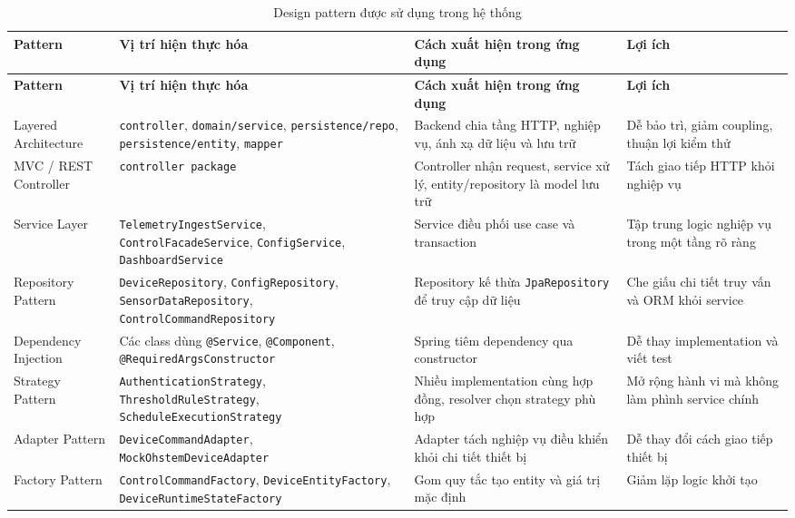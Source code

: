 {\scriptsize
\setlength{\tabcolsep}{3pt}
\renewcommand{\arraystretch}{1.12}
\begin{longtable}{|p{}|p{}|p{}|p{}|}
\caption{Design pattern được sử dụng trong hệ thống}\\
\hline
\textbf{Pattern} & \textbf{Vị trí hiện thực hóa} & \textbf{Cách xuất hiện trong ứng dụng} & \textbf{Lợi ích} \\
\hline
\endfirsthead
\hline
\textbf{Pattern} & \textbf{Vị trí hiện thực hóa} & \textbf{Cách xuất hiện trong ứng dụng} & \textbf{Lợi ích} \\
\hline
\endhead
Layered Architecture & \texttt{controller}, \texttt{domain/service}, \texttt{persistence/repo}, \texttt{persistence/entity}, \texttt{mapper} & Backend chia tầng HTTP, nghiệp vụ, ánh xạ dữ liệu và lưu trữ & Dễ bảo trì, giảm coupling, thuận lợi kiểm thử \\
\hline
MVC / REST Controller & \texttt{controller package} & Controller nhận request, service xử lý, entity/repository là model lưu trữ & Tách giao tiếp HTTP khỏi nghiệp vụ \\
\hline
Service Layer & \texttt{TelemetryIngestService}, \texttt{ControlFacadeService}, \texttt{ConfigService}, \texttt{DashboardService} & Service điều phối use case và transaction & Tập trung logic nghiệp vụ trong một tầng rõ ràng \\
\hline
Repository Pattern & \texttt{DeviceRepository}, \texttt{ConfigRepository}, \texttt{SensorDataRepository}, \texttt{ControlCommandRepository} & Repository kế thừa \texttt{JpaRepository} để truy cập dữ liệu & Che giấu chi tiết truy vấn và ORM khỏi service \\
\hline
Dependency Injection & Các class dùng \texttt{@Service}, \texttt{@Component}, \texttt{@RequiredArgsConstructor} & Spring tiêm dependency qua constructor & Dễ thay implementation và viết test \\
\hline
Strategy Pattern & \texttt{AuthenticationStrategy}, \texttt{ThresholdRuleStrategy}, \texttt{ScheduleExecutionStrategy} & Nhiều implementation cùng hợp đồng, resolver chọn strategy phù hợp & Mở rộng hành vi mà không làm phình service chính \\
\hline
Adapter Pattern & \texttt{DeviceCommandAdapter}, \texttt{MockOhstemDeviceAdapter} & Adapter tách nghiệp vụ điều khiển khỏi chi tiết thiết bị & Dễ thay đổi cách giao tiếp thiết bị \\
\hline
Factory Pattern & \texttt{ControlCommandFactory}, \texttt{DeviceEntityFactory}, \texttt{DeviceRuntimeStateFactory} & Gom quy tắc tạo entity và giá trị mặc định & Giảm lặp logic khởi tạo \\

\end{longtable}}
